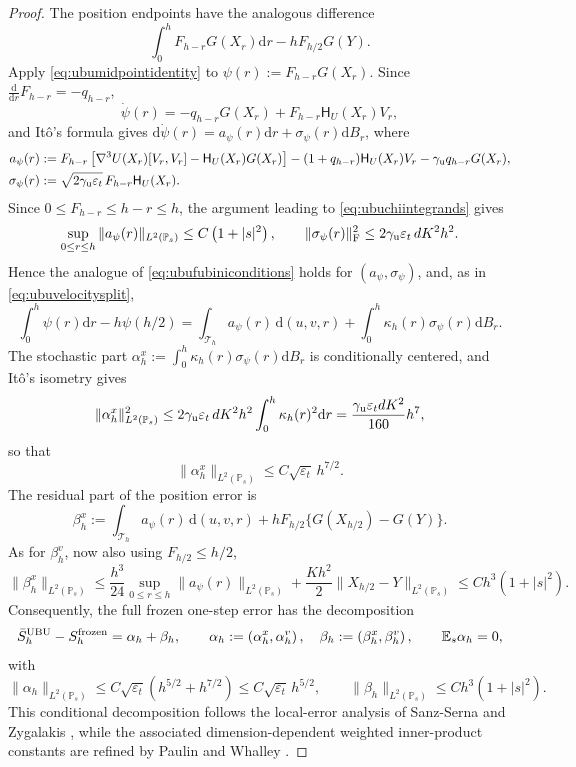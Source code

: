 \documentclass[11pt]{article}
\theoremstyle{definition}
\newcommand{\E}{\mathbb E}
\newcommand{\dd}{\mathrm d}
\newcommand{\eps}{\varepsilon}
\begin{document}
\begin{proof}
The position endpoints have the analogous difference
\[
 \int_0^hF_{h-r}G(X_r)\dd r-hF_{h/2}G(Y).
\]
Apply \eqref{eq:ubumidpointidentity} to $\psi(r):=F_{h-r}G(X_r)$. Since
$\frac{\dd}{\dd r}F_{h-r}=-q_{h-r}$,
\[
 \dot\psi(r)=-q_{h-r}G(X_r)+F_{h-r}\mathsf H_U(X_r)V_r,
\]
and It\^o's formula gives
$\dd\dot\psi(r)=a_\psi(r)\dd r+\sigma_\psi(r)\dd B_r$, where
\begin{align*}
 a_\psi(r)&:=F_{h-r}\left[\nabla^3U(X_r)[V_r,V_r]
              -\mathsf H_U(X_r)G(X_r)\right]
   -(1+q_{h-r})\mathsf H_U(X_r)V_r-\gamma_{\rm u}q_{h-r}G(X_r),\\
 \sigma_\psi(r)&:=\sqrt{2\gamma_{\rm u}\eps_t}\,F_{h-r}\mathsf H_U(X_r).
\end{align*}
Since $0\leq F_{h-r}\leq h-r\leq h$, the argument leading to
\eqref{eq:ubuchiintegrands} gives
\[
 \sup_{0\leq r\leq h}\|a_\psi(r)\|_{L^2(\mathbb P_s)}\leq C\left(1+|s|^2\right),
 \qquad
 \|\sigma_\psi(r)\|_{\rm F}^2\leq2\gamma_{\rm u}\eps_t\,dK^2h^2.
\]
Hence the analogue of \eqref{eq:ubufubiniconditions} holds for
$(a_\psi,\sigma_\psi)$, and, as in \eqref{eq:ubuvelocitysplit},
\[
 \int_0^h\psi(r)\dd r-h\psi(h/2)
 =\int_{\mathcal T_h}a_\psi(r)\,\dd(u,v,r)
  +\int_0^h\kappa_h(r)\sigma_\psi(r)\dd B_r.
\]
The stochastic part
$\alpha_h^x:=\int_0^h\kappa_h(r)\sigma_\psi(r)\dd B_r$ is conditionally
centered, and It\^o's isometry gives
\[
 \|\alpha_h^x\|_{L^2(\mathbb P_s)}^2
 \leq2\gamma_{\rm u}\eps_t\,dK^2h^2\int_0^h\kappa_h(r)^2\dd r
 =\frac{\gamma_{\rm u}\eps_t dK^2}{160}h^7,
\]
so that
\[
 \|\alpha_h^x\|_{L^2(\mathbb P_s)}\leq C\sqrt{\eps_t}\,h^{7/2}.
\]
The residual part of the position error is
\[
 \beta_h^x:=\int_{\mathcal T_h}a_\psi(r)\,\dd(u,v,r)
 +hF_{h/2}\{G(X_{h/2})-G(Y)\}.
\]
As for $\beta_h^v$, now also using $F_{h/2}\leq h/2$,
\[
 \|\beta_h^x\|_{L^2(\mathbb P_s)}
 \leq\frac{h^3}{24}\sup_{0\leq r\leq h}\|a_\psi(r)\|_{L^2(\mathbb P_s)}
 +\frac{Kh^2}{2}\|X_{h/2}-Y\|_{L^2(\mathbb P_s)}
 \leq Ch^3\left(1+|s|^2\right).
\]
Consequently, the full frozen one-step error has the
decomposition
\begin{equation}\label{eq:ubulocaldecomposition}
 \bar S_h^{\rm UBU}-S_h^{\rm frozen}=\alpha_h+\beta_h,\qquad
 \alpha_h:=\left(\alpha_h^x,\alpha_h^v\right),\quad
 \beta_h:=\left(\beta_h^x,\beta_h^v\right),\qquad
 \E_s\alpha_h=0,
\end{equation}
with
\[
 \|\alpha_h\|_{L^2(\mathbb P_s)}
 \leq C\sqrt{\eps_t}\left(h^{5/2}+h^{7/2}\right)
 \leq C\sqrt{\eps_t}\,h^{5/2},\qquad
 \|\beta_h\|_{L^2(\mathbb P_s)}
 \leq Ch^3(1+|s|^2).
\]
This conditional decomposition follows the local-error analysis of
Sanz-Serna and Zygalakis \cite[Section~7.6]{SanzSernaZygalakis2021}, while
the associated dimension-dependent weighted inner-product constants are
refined by Paulin and Whalley \cite{PaulinWhalley2024}.


\end{proof}
\end{document}
